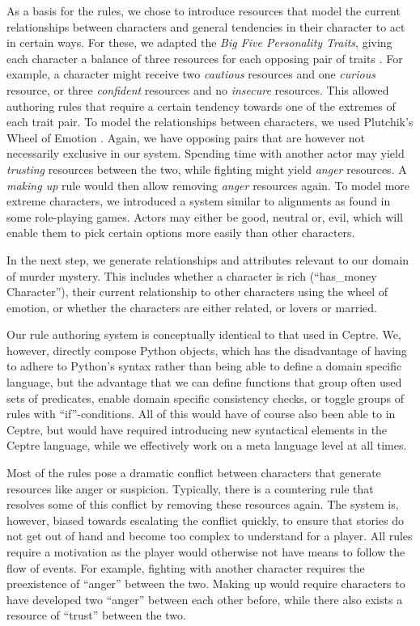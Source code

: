 As a basis for the rules, we chose to introduce resources that model the current relationships between characters and general tendencies in their character to act in certain ways. For these, we adapted the \emph{Big Five Personality Traits}, giving each character a balance of three resources for each opposing pair of traits \cite{rothmann_coetzer_2003}. For example, a character might receive two \emph{cautious} resources and one \emph{curious} resource, or three \emph{confident} resources and no \emph{insecure} resources. This allowed authoring rules that require a certain tendency towards one of the extremes of each trait pair. To model the relationships between characters, we used Plutchik's Wheel of Emotion \cite{plutchik_2001}. Again, we have opposing pairs that are however not necessarily exclusive in our system. Spending time with another actor may yield \emph{trusting} resources between the two, while fighting might yield \emph{anger} resources. A \emph{making up} rule would then allow removing \emph{anger} resources again. To model more extreme characters, we introduced a system similar to alignments as found in some role-playing games. Actors may either be good, neutral or, evil, which will enable them to pick certain options more easily than other characters.

In the next step, we generate relationships and attributes relevant to our domain of murder mystery. This includes whether a character is rich (\enquote{has\_money Character}), their current relationship to other characters using the wheel of emotion, or whether the characters are either related, or lovers or married.

Our rule authoring system is conceptually identical to that used in Ceptre. We, however, directly compose Python objects, which has the disadvantage of having to adhere to Python's syntax rather than being able to define a domain specific language, but the advantage that we can define functions that group often used sets of predicates, enable domain specific consistency checks, or toggle groups of rules with \enquote{if}-conditions. All of this would have of course also been able to in Ceptre, but would have required introducing new syntactical elements in the Ceptre language, while we effectively work on a meta language level at all times.

Most of the rules pose a dramatic conflict between characters that generate resources like anger or suspicion.
Typically, there is a countering rule that resolves some of this conflict by removing these resources again.
The system is, however, biased towards escalating the conflict quickly, to ensure that stories do not get out of hand and become too complex to understand for a player. All rules require a motivation as the player would otherwise not have means to follow the flow of events. For example, fighting with another character requires the preexistence of \enquote{anger} between the two. Making up would require characters to have developed two \enquote{anger} between each other before, while there also exists a resource of \enquote{trust} between the two. 

